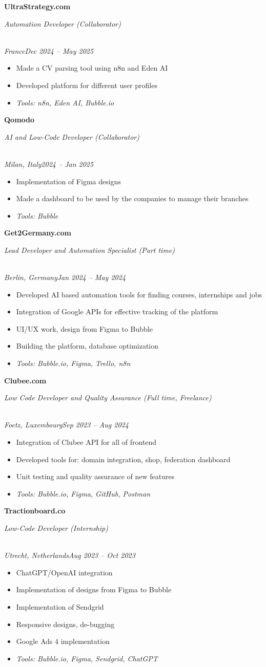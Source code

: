 \documentclass[a4paper,10pt]{article}
\newcommand{\role}[4]{\vspace{3pt}\noindent\hspace{0.6em}\parbox[t]{0.38\textwidth}{\raggedright\textbf{#1}}\hfill\parbox[t]{0.58\textwidth}{\raggedleft\textit{#2}}\\{\textit{#3}\hfill\textit{#4}}\vspace{1pt}}
\begin{document}
\role{UltraStrategy.com}{Automation Developer (Collaborator)}{France}{Dec 2024 -- May 2025}
\begin{itemize}
\item Made a CV parsing tool using n8n and Eden AI
\item Developed platform for different user profiles
\item \textit{Tools: n8n, Eden AI, Bubble.io}
\end{itemize}

\role{Qomodo}{AI and Low-Code Developer (Collaborator)}{Milan, Italy}{2024 -- Jan 2025}
\begin{itemize}
\item Implementation of Figma designs
\item Made a dashboard to be used by the companies to manage their branches
\item \textit{Tools: Bubble}
\end{itemize}

\role{Get2Germany.com}{Lead Developer and Automation Specialist (Part time)}{Berlin, Germany}{Jan 2024 -- May 2024}
\begin{itemize}
\item Developed AI based automation tools for finding courses, internships and jobs
\item Integration of Google APIs for effective tracking of the platform
\item UI/UX work, design from Figma to Bubble
\item Building the platform, database optimization
\item \textit{Tools: Bubble.io, Figma, Trello, n8n}
\end{itemize}

\role{Clubee.com}{Low Code Developer and Quality Assurance (Full time, Freelance)}{Foetz, Luxembourg}{Sep 2023 -- Aug 2024}
\begin{itemize}
\item Integration of Clubee API for all of frontend
\item Developed tools for: domain integration, shop, federation dashboard
\item Unit testing and quality assurance of new features
\item \textit{Tools: Bubble.io, Figma, GitHub, Postman}
\end{itemize}

\role{Tractionboard.co}{Low-Code Developer (Internship)}{Utrecht, Netherlands}{Aug 2023 -- Oct 2023}
\begin{itemize}
\item ChatGPT/OpenAI integration
\item Implementation of designs from Figma to Bubble
\item Implementation of Sendgrid
\item Responsive designs, de-bugging
\item Google Ads 4 implementation
\item \textit{Tools: Bubble.io, Figma, Sendgrid, ChatGPT}
\end{itemize}
\end{document}
